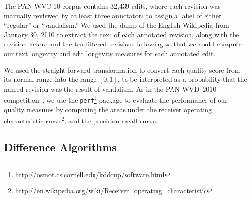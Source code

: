 The PAN-WVC-10 corpus contains 32,439 edits, where each revision was
manually reviewed by at least three annotators to assign a label
of either ``regular'' or ``vandalism.''
We used the dump of the English Wikipedia from January 30, 2010
to extract the text of each annotated revision, along with the revision
before and the ten filtered revisions following so that we could compute
our text longevity and edit longevity measures for each annotated edit.

We used the straight-forward transformation to convert
each quality score from its normal range into the range
$[0,1]$, to be interpreted as a probability that the named
revision was the result of vandalism.
As in the PAN-WVD~2010 competition~\cite{Potthast2010b}, we use the
\texttt{perf}\footnote{\url{http://osmot.cs.cornell.edu/kddcup/software.html}}
package to evaluate the performance of our quality measures
by computing the areas under the receiver operating characteristic
curve\footnote{\url{http://en.wikipedia.org/wiki/Receiver_operating_characteristic}},
and the precision-recall curve.

\subsection{Difference Algorithms}

